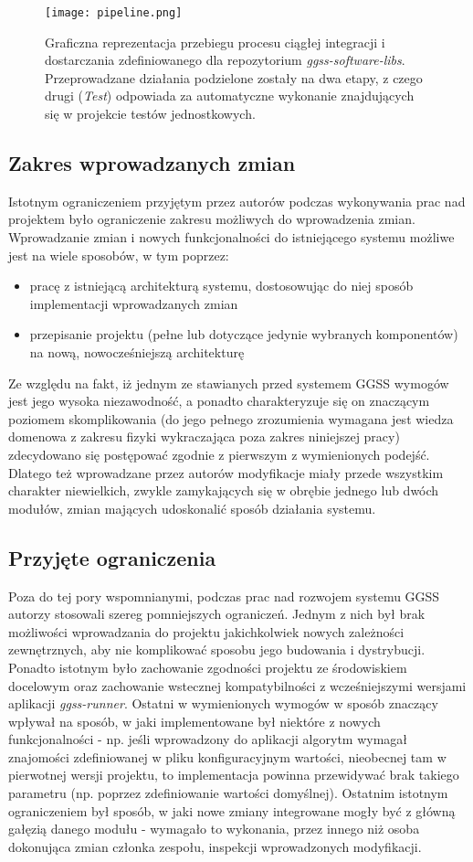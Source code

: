 \begin{figure}[H]
\centering
\texttt{[image: pipeline.png]}
\caption{Graficzna reprezentacja przebiegu procesu ciągłej integracji i dostarczania zdefiniowanego dla repozytorium \emph{ggss-software-libs}. Przeprowadzane działania podzielone zostały na dwa etapy, z czego drugi (\emph{Test}) odpowiada za automatyczne wykonanie znajdujących się w projekcie testów jednostkowych.}
\label{fig:cicd_tests}
\end{figure}

\clearpage
\subsection{Zakres wprowadzanych zmian}
Istotnym ograniczeniem przyjętym przez autorów podczas wykonywania prac nad projektem było ograniczenie zakresu możliwych do wprowadzenia zmian. Wprowadzanie zmian i nowych funkcjonalności do istniejącego systemu możliwe jest na wiele sposobów, w tym poprzez: 
\begin{itemize}
    \item pracę z istniejącą architekturą systemu, dostosowując do niej sposób implementacji wprowadzanych zmian
    \item przepisanie projektu (pełne lub dotyczące jedynie wybranych komponentów) na nową, nowocześniejszą architekturę
\end{itemize}
Ze względu na fakt, iż jednym ze stawianych przed systemem GGSS wymogów jest jego wysoka niezawodność, a ponadto charakteryzuje się on znaczącym poziomem skomplikowania (do jego pełnego zrozumienia wymagana jest wiedza domenowa z zakresu fizyki wykraczająca poza zakres niniejszej pracy) zdecydowano się postępować zgodnie z pierwszym z wymienionych podejść. Dlatego też wprowadzane przez autorów modyfikacje miały przede wszystkim charakter niewielkich, zwykle zamykających się w obrębie jednego lub dwóch modułów, zmian mających udoskonalić sposób działania systemu. 

\subsection{Przyjęte ograniczenia}
Poza do tej pory wspomnianymi, podczas prac nad rozwojem systemu GGSS autorzy stosowali szereg pomniejszych ograniczeń. Jednym z nich był brak możliwości wprowadzania do projektu jakichkolwiek nowych zależności zewnętrznych, aby nie komplikować sposobu jego budowania i dystrybucji. Ponadto istotnym było zachowanie zgodności projektu ze środowiskiem docelowym oraz zachowanie wstecznej kompatybilności z wcześniejszymi wersjami aplikacji \emph{ggss-runner}. Ostatni w wymienionych wymogów w sposób znaczący wpływał na sposób, w jaki implementowane był niektóre z nowych funkcjonalności - np. jeśli wprowadzony do aplikacji algorytm wymagał znajomości zdefiniowanej w pliku konfiguracyjnym wartości, nieobecnej tam w pierwotnej wersji projektu, to implementacja powinna przewidywać brak takiego parametru (np. poprzez zdefiniowanie wartości domyślnej). Ostatnim istotnym ograniczeniem był sposób, w jaki nowe zmiany integrowane mogły być z główną gałęzią danego modułu - wymagało to wykonania, przez innego niż osoba dokonująca zmian członka zespołu, inspekcji wprowadzonych modyfikacji.

